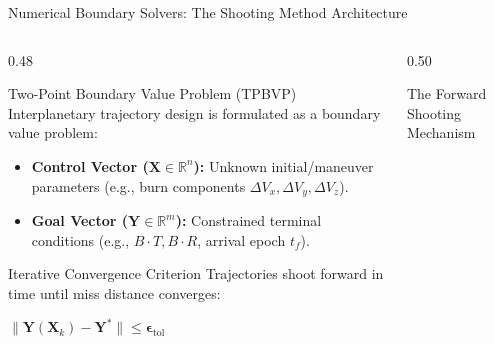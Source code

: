 \documentclass[aspectratio=169, 10pt]{beamer}
\begin{document}
\begin{frame}{Numerical Boundary Solvers: The Shooting Method Architecture}
    \begin{columns}[t]
        \begin{column}{0.48\textwidth}
            \begin{block}{Two-Point Boundary Value Problem (TPBVP)}
                \scriptsize
                Interplanetary trajectory design is formulated as a boundary value problem:
                \begin{itemize}\setlength{\itemsep}{2pt}\setlength{\topsep}{1pt}
                    \item \textbf{Control Vector ($\mathbf{X} \in \mathbb{R}^n$):} Unknown initial/maneuver parameters (e.g., burn components $\Delta V_x, \Delta V_y, \Delta V_z$).
                    \item \textbf{Goal Vector ($\mathbf{Y} \in \mathbb{R}^m$):} Constrained terminal conditions (e.g., $B\cdot T, B\cdot R$, arrival epoch $t_f$).
                \end{itemize}
            \end{block}

            \vspace{-0.1cm}

            \begin{alertblock}{Iterative Convergence Criterion}
                \scriptsize
                Trajectories shoot forward in time until miss distance converges:
                \par\vspace{2pt}
                {\centering $\|\mathbf{Y}(\mathbf{X}_k) - \mathbf{Y}^*\| \le \boldsymbol{\epsilon}_{\text{tol}}$\par}
            \end{alertblock}
        \end{column}

        \begin{column}{0.50\textwidth}
            \begin{block}{The Forward Shooting Mechanism}
                \centering
                \vspace{0.15cm}
\end{block}
\end{column}
\end{columns}
\end{frame}
\end{document}
